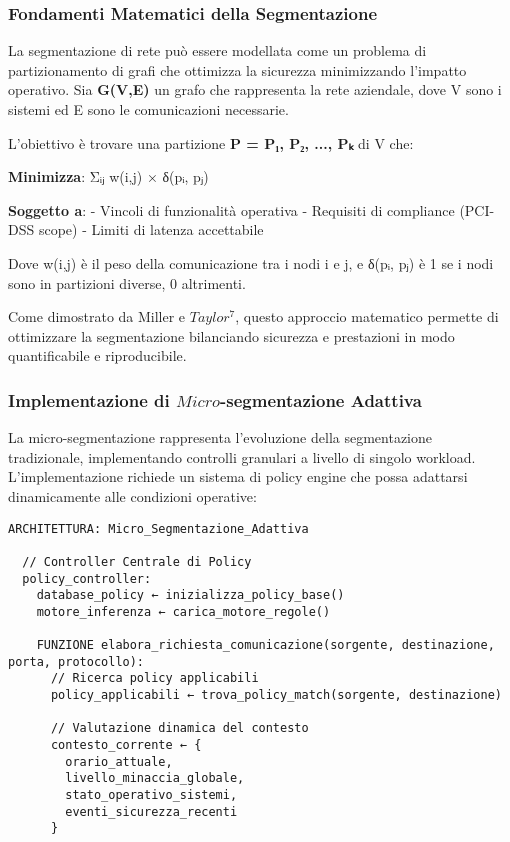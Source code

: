 {\subsubsection{Fondamenti Matematici della Segmentazione}

La segmentazione di rete può essere modellata come un problema di partizionamento di grafi che ottimizza la sicurezza minimizzando l'impatto operativo. Sia \textbf{G(V,E)} un grafo che rappresenta la rete aziendale, dove V sono i sistemi ed E sono le comunicazioni necessarie.

L'obiettivo è trovare una partizione \textbf{P = {P₁, P₂, ..., Pₖ}} di V che:

\textbf{Minimizza}: Σᵢⱼ w(i,j) × δ(pᵢ, pⱼ)

\textbf{Soggetto a}: 
- Vincoli di funzionalità operativa
- Requisiti di compliance (PCI-DSS scope)
- Limiti di latenza accettabile

Dove w(i,j) è il peso della comunicazione tra i nodi i e j, e δ(pᵢ, pⱼ) è 1 se i nodi sono in partizioni diverse, 0 altrimenti.

Come dimostrato da Miller e $Taylor$$^{7}$, questo approccio matematico permette di ottimizzare la segmentazione bilanciando sicurezza e prestazioni in modo quantificabile e riproducibile.

\subsubsection{Implementazione di $Micro$-segmentazione Adattiva}

La micro-segmentazione rappresenta l'evoluzione della segmentazione tradizionale, implementando controlli granulari a livello di singolo workload. L'implementazione richiede un sistema di policy engine che possa adattarsi dinamicamente alle condizioni operative:

\begin{verbatim}
ARCHITETTURA: Micro_Segmentazione_Adattiva

  // Controller Centrale di Policy
  policy_controller:
    database_policy ← inizializza_policy_base()
    motore_inferenza ← carica_motore_regole()
    
    FUNZIONE elabora_richiesta_comunicazione(sorgente, destinazione, porta, protocollo):
      // Ricerca policy applicabili
      policy_applicabili ← trova_policy_match(sorgente, destinazione)
      
      // Valutazione dinamica del contesto
      contesto_corrente ← {
        orario_attuale,
        livello_minaccia_globale,
        stato_operativo_sistemi,
        eventi_sicurezza_recenti
      }
      

\end{verbatim}}
